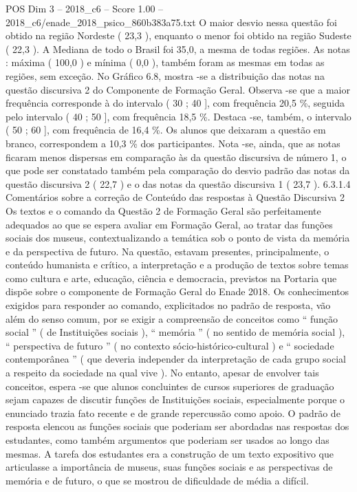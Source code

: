 \begin{textsample}{POS Dim 3 – 2018\_c6 – Score 1.00 – 2018\_c6/enade\_2018\_psico\_860b383a75.txt}
O maior desvio nessa questão foi obtido na região Nordeste ( 23,3 ), enquanto o menor foi obtido na região Sudeste ( 22,3 ).
A Mediana de todo o Brasil foi 35,0, a mesma de todas regiões.
As notas : máxima ( 100,0 ) e mínima ( 0,0 ), também foram as mesmas em todas as regiões, sem exceção.
No Gráfico 6.8, mostra -se a distribuição das notas na questão discursiva 2 do Componente de Formação Geral.
Observa -se que a maior frequência corresponde à do intervalo ( 30 ; 40 ], com frequência 20,5 \%, seguida pelo intervalo ( 40 ; 50 ], com frequência 18,5 \%.
Destaca -se, também, o intervalo ( 50 ; 60 ], com frequência de 16,4 \%.
Os alunos que deixaram a questão em branco, correspondem a 10,3 \% dos participantes.
Nota -se, ainda, que as notas ficaram menos dispersas em comparação às da questão discursiva de número 1, o que pode ser constatado também pela comparação do desvio padrão das notas da questão discursiva 2 ( 22,7 ) e o das notas da questão discursiva 1 ( 23,7 ). 6.3.1.4 Comentários sobre a correção de Conteúdo das respostas à Questão Discursiva 2 Os textos e o comando da Questão 2 de Formação Geral são perfeitamente adequados ao que se espera avaliar em Formação Geral, ao tratar das funções sociais dos museus, contextualizando a temática sob o ponto de vista da memória e da perspectiva de futuro.
Na questão, estavam presentes, principalmente, o conteúdo humanista e crítico, a interpretação e a produção de textos sobre temas como cultura e arte, educação, ciência e democracia, previstos na Portaria que dispõe sobre o componente de Formação Geral do Enade 2018.
Os conhecimentos exigidos para responder ao comando, explicitados no padrão de resposta, vão além do senso comum, por se exigir a compreensão de conceitos como “ função social ” ( de Instituições sociais ), “ memória ” ( no sentido de memória social ), “ perspectiva de futuro ” ( no contexto sócio-histórico-cultural ) e “ sociedade contemporânea ” ( que deveria independer da interpretação de cada grupo social a respeito da sociedade na qual vive ).
No entanto, apesar de envolver tais conceitos, espera -se que alunos concluintes de cursos superiores de graduação sejam capazes de discutir funções de Instituições sociais, especialmente porque o enunciado trazia fato recente e de grande repercussão como apoio.
O padrão de resposta elencou as funções sociais que poderiam ser abordadas nas respostas dos estudantes, como também argumentos que poderiam ser usados ao longo das mesmas.
A tarefa dos estudantes era a construção de um texto expositivo que articulasse a importância de museus, suas funções sociais e as perspectivas de memória e de futuro, o que se mostrou de dificuldade de média a difícil.

\end{textsample}
